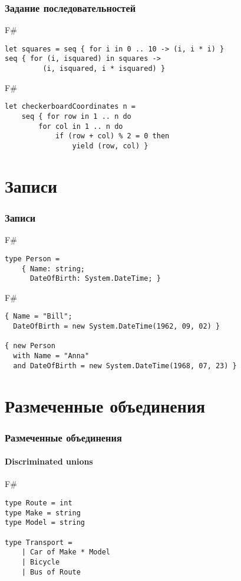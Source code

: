 \documentclass[xetex,mathserif,serif]{beamer}
\begin{document}
	\begin{frame}[fragile]
		\frametitle{Задание последовательностей}
			\begin{exampleblock}{F\#}
				\begin{lstlisting}
let squares = seq { for i in 0 .. 10 -> (i, i * i) }
seq { for (i, isquared) in squares -> 
         (i, isquared, i * isquared) }
\end{lstlisting}
\end{exampleblock}
			
			\begin{exampleblock}{F\#}
				\begin{lstlisting}
let checkerboardCoordinates n =
    seq { for row in 1 .. n do
        for col in 1 .. n do
            if (row + col) % 2 = 0 then
                yield (row, col) }
\end{lstlisting}
\end{exampleblock}	
\end{frame}

	\section{Записи}
	
	\begin{frame}[fragile]
		\frametitle{Записи}
		\begin{exampleblock}{F\#}
			\begin{lstlisting}
type Person =
    { Name: string;
      DateOfBirth: System.DateTime; }
\end{lstlisting}
\end{exampleblock}

		\begin{exampleblock}{F\#}
			\begin{lstlisting}
{ Name = "Bill"; 
  DateOfBirth = new System.DateTime(1962, 09, 02) }

{ new Person
  with Name = "Anna"
  and DateOfBirth = new System.DateTime(1968, 07, 23) }
\end{lstlisting}
\end{exampleblock}
	
\end{frame}

	\section{Размеченные объединения}
	
	\begin{frame}[fragile]
		\frametitle{Размеченные объединения}
		\framesubtitle{Discriminated unions}
		\begin{exampleblock}{F\#}
			\begin{lstlisting}
type Route = int
type Make = string
type Model = string

type Transport =
    | Car of Make * Model
    | Bicycle
    | Bus of Route
\end{lstlisting}
\end{exampleblock}
		
\end{frame}
\end{document}
